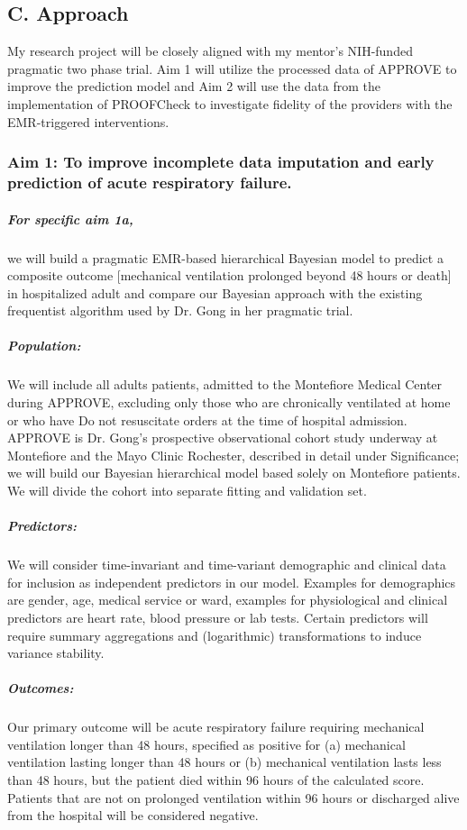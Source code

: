 \documentclass[11pt,notitlepage]{article}
\begin{document}
\subsection*{C. Approach}
My research project will be closely aligned with my mentor's NIH-funded pragmatic two phase trial. Aim 1 will utilize the processed data of APPROVE to improve the prediction model and Aim 2 will use the data from the implementation of PROOFCheck to investigate fidelity of the providers with the EMR-triggered interventions.

\subsubsection*{Aim 1: To improve incomplete data imputation and early prediction of acute respiratory failure.}


\subparagraph*{For specific aim 1a,} we will build a pragmatic EMR-based hierarchical Bayesian model to predict a composite outcome [mechanical ventilation prolonged beyond 48 hours or death] in hospitalized adult and compare our Bayesian approach with the existing frequentist algorithm used by Dr. Gong in her pragmatic trial.

\subparagraph*{Population:}
We will include all adults patients, admitted to the Montefiore Medical Center during APPROVE, excluding only those who are chronically ventilated at home or who have Do not resuscitate orders at the time of hospital admission. APPROVE is Dr. Gong's prospective observational cohort study underway at Montefiore and the Mayo Clinic Rochester, described in detail under Significance; we will build our Bayesian hierarchical model based solely on Montefiore patients. We will divide the cohort into separate fitting and validation set.

\subparagraph*{Predictors:}
We will consider time-invariant and time-variant demographic and clinical data for inclusion as independent predictors in our model. Examples for demographics are gender, age, medical service or ward, examples for physiological and clinical predictors are heart rate, blood pressure or lab tests. Certain predictors will require summary aggregations and (logarithmic) transformations to induce variance stability.

\subparagraph*{Outcomes:}
Our primary outcome will be acute respiratory failure requiring mechanical ventilation longer than 48 hours, specified as positive for (a) mechanical ventilation lasting longer than 48 hours or (b) mechanical ventilation lasts less than 48 hours, but the patient died within 96 hours of the calculated score. Patients that are not on prolonged ventilation within 96 hours or discharged alive from the hospital will be considered negative.
\end{document}
